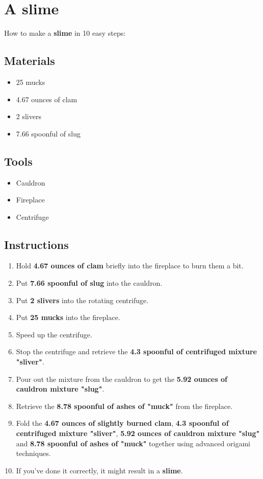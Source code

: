 \documentclass{article}
\begin{document}
\section{A slime}How to make a \textbf{slime} in 10 easy steps:

\subsection{Materials}\begin{itemize}
\item 
25 mucks
\item 
4.67 ounces of clam
\item 
2 slivers
\item 
7.66 spoonful of slug
\end{itemize}
\subsection{Tools}\begin{itemize}
\item 
Cauldron
\item 
Fireplace
\item 
Centrifuge
\end{itemize}
\subsection{Instructions}\begin{enumerate}
\item 
Hold \textbf{4.67 ounces of clam} briefly into the fireplace to burn them a bit.
\item 
Put \textbf{7.66 spoonful of slug} into the cauldron.
\item 
Put \textbf{2 slivers} into the rotating centrifuge.
\item 
Put \textbf{25 mucks} into the fireplace.
\item 
Speed up the centrifuge.
\item 
Stop the centrifuge and retrieve the \textbf{4.3 spoonful of centrifuged mixture "sliver"}.
\item 
Pour out the mixture from the cauldron to get the \textbf{5.92 ounces of cauldron mixture "slug"}.
\item 
Retrieve the \textbf{8.78 spoonful of ashes of "muck"} from the fireplace.
\item 
Fold the \textbf{4.67 ounces of slightly burned clam}, \textbf{4.3 spoonful of centrifuged mixture "sliver"}, \textbf{5.92 ounces of cauldron mixture "slug"} and \textbf{8.78 spoonful of ashes of "muck"} together using advanced origami techniques.
\item 
If you've done it correctly, it might result in a \textbf{slime}.
\end{enumerate}
\newpage
\end{document}
